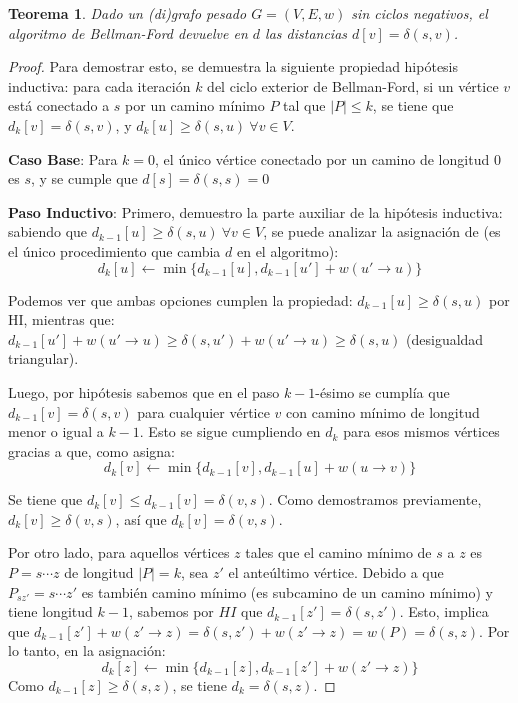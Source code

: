 \documentclass[a4paper]{report}
\newtheorem*{theorem*}{Teorema}
\begin{document}
\begin{theorem*}
    Dado un (di)grafo pesado $G = (V, E, w)$ sin ciclos negativos, el algoritmo de Bellman-Ford devuelve en $d$ las distancias $d[v] = \delta(s, v)$.
\end{theorem*}
\begin{proof}
    Para demostrar esto, se demuestra la siguiente propiedad hipótesis inductiva: para cada iteración $k$ del ciclo exterior de Bellman-Ford, si un vértice $v$ está conectado a $s$ por un camino mínimo $P$ tal que $|P| \leq k$, se tiene que $d_{k}[v] = \delta(s, v)$, y $d_k[u] \geq \delta(s, u)\ \forall v \in V$.

    \textbf{Caso Base}: Para $k = 0$, el único vértice conectado por un camino de longitud $0$ es $s$, y se cumple que $d[s] = \delta(s, s) = 0$

    \textbf{Paso Inductivo}: Primero, demuestro la parte auxiliar de la hipótesis inductiva: sabiendo que $d_{k - 1}[u] \geq \delta(s, u)\ \forall v \in V$, se puede analizar la asignación de  (es el único procedimiento que cambia $d$ en el algoritmo):
    $$d_k[u] \gets \min{\{d_{k - 1}[u], d_{k - 1}[u'] + w(u' \rightarrow u)\}}$$

    Podemos ver que ambas opciones cumplen la propiedad: $d_{k - 1}[u] \geq \delta(s, u)$ por HI, mientras que: $d_{k - 1}[u'] + w(u' \rightarrow u) \geq \delta(s, u') + w(u' \rightarrow u) \geq \delta(s, u)$ (desigualdad triangular).

    Luego, por hipótesis sabemos que en el paso $k - 1$-ésimo se cumplía que $d_{k - 1}[v] = \delta(s, v)$ para cualquier vértice $v$ con camino mínimo de longitud menor o igual a $k - 1$. Esto se sigue cumpliendo en $d_k$ para esos mismos vértices gracias a que, como  asigna:
    $$d_k[v] \gets \min{\{d_{k - 1}[v], d_{k - 1}[u] + w(u \rightarrow v)\}}$$

    Se tiene que $d_k[v] \leq d_{k - 1}[v] = \delta(v, s)$. Como demostramos previamente, $d_k[v] \geq \delta(v, s)$, así que $d_k[v] = \delta(v, s)$.

    Por otro lado, para aquellos vértices $z$ tales que el camino mínimo de $s$ a $z$ es $P = s \cdots z$ de longitud $|P| = k$, sea $z'$ el anteúltimo vértice. Debido a que $P_{sz'} = s \cdots z'$ es también camino mínimo (es subcamino de un camino mínimo) y tiene longitud $k - 1$, sabemos por $HI$ que $d_{k - 1}[z'] = \delta(s, z')$. Esto, implica que $d_{k - 1}[z'] + w(z' \rightarrow z) = \delta(s, z') + w(z' \rightarrow z) = w(P) = \delta(s, z)$. Por lo tanto, en la asignación:
    $$d_k[z] \gets \min{\{d_{k - 1}[z], d_{k - 1}[z'] + w(z' \rightarrow z)\}}$$
    Como $d_{k - 1}[z] \geq \delta(s, z)$, se tiene $d_k = \delta(s, z)$.


\end{proof}
\end{document}

